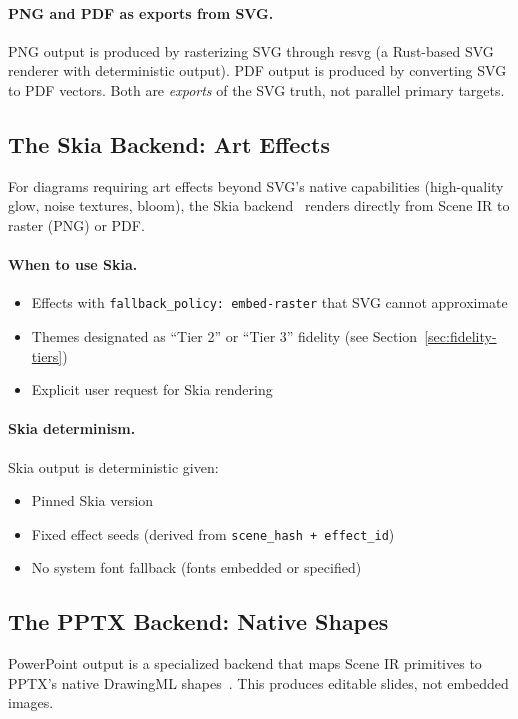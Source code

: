 \paragraph{PNG and PDF as exports from SVG.}
PNG output is produced by rasterizing SVG through resvg (a Rust-based SVG renderer with deterministic output). PDF output is produced by converting SVG to PDF vectors. Both are \emph{exports} of the SVG truth, not parallel primary targets.

\subsection{The Skia Backend: Art Effects}

For diagrams requiring art effects beyond SVG's native capabilities (high-quality glow, noise textures, bloom), the Skia backend~\cite{skia} renders directly from Scene IR to raster (PNG) or PDF.

\paragraph{When to use Skia.}
\begin{itemize}
  \item Effects with \texttt{fallback\_policy: embed-raster} that SVG cannot approximate
  \item Themes designated as ``Tier 2'' or ``Tier 3'' fidelity (see Section~\ref{sec:fidelity-tiers})
  \item Explicit user request for Skia rendering
\end{itemize}

\paragraph{Skia determinism.}
Skia output is deterministic given:
\begin{itemize}
  \item Pinned Skia version
  \item Fixed effect seeds (derived from \texttt{scene\_hash + effect\_id})
  \item No system font fallback (fonts embedded or specified)
\end{itemize}

\subsection{The PPTX Backend: Native Shapes}

PowerPoint output is a specialized backend that maps Scene IR primitives to PPTX's native DrawingML shapes~\cite{ooxml}. This produces editable slides, not embedded images.

